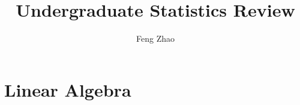 \documentclass{book}
\title{Undergraduate Statistics Review}
\author{Feng Zhao}
\begin{document}
\maketitle
\chapter{Linear Algebra}

\end{document}
